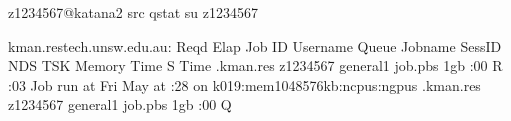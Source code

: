 \documentclass[letterpaper,10pt,english]{sphinxmanual}
\begin{document}
\begin{sphinxVerbatim}[commandchars=\\\{\}]
\PYG{o}{[}z1234567@katana2 src\PYG{o}{]}\PYGZdl{} qstat \PYGZhy{}su z1234567

kman.restech.unsw.edu.au:
                                                            Reqd   Elap
Job ID          Username Queue    Jobname    SessID NDS TSK Memory Time  S Time
\PYGZhy{}\PYGZhy{}\PYGZhy{}\PYGZhy{}\PYGZhy{}\PYGZhy{}\PYGZhy{}\PYGZhy{}\PYGZhy{}\PYGZhy{}\PYGZhy{}\PYGZhy{}\PYGZhy{}\PYGZhy{}\PYGZhy{} \PYGZhy{}\PYGZhy{}\PYGZhy{}\PYGZhy{}\PYGZhy{}\PYGZhy{}\PYGZhy{}\PYGZhy{} \PYGZhy{}\PYGZhy{}\PYGZhy{}\PYGZhy{}\PYGZhy{}\PYGZhy{}\PYGZhy{}\PYGZhy{} \PYGZhy{}\PYGZhy{}\PYGZhy{}\PYGZhy{}\PYGZhy{}\PYGZhy{}\PYGZhy{}\PYGZhy{}\PYGZhy{}\PYGZhy{} \PYGZhy{}\PYGZhy{}\PYGZhy{}\PYGZhy{}\PYGZhy{}\PYGZhy{} \PYGZhy{}\PYGZhy{}\PYGZhy{} \PYGZhy{}\PYGZhy{}\PYGZhy{} \PYGZhy{}\PYGZhy{}\PYGZhy{}\PYGZhy{}\PYGZhy{}\PYGZhy{} \PYGZhy{}\PYGZhy{}\PYGZhy{}\PYGZhy{}\PYGZhy{} \PYGZhy{} \PYGZhy{}\PYGZhy{}\PYGZhy{}\PYGZhy{}\PYGZhy{}
.kman.res z1234567 general1 job.pbs               1gb :00 R :03
   Job run at Fri May  at :28 on k019:mem1048576kb:ncpus:ngpus
.kman.res z1234567 general1 job.pbs       \PYGZhy{}\PYGZhy{}           1gb :00 Q   \PYGZhy{}\PYGZhy{}
    \PYGZhy{}\PYGZhy{}
\end{sphinxVerbatim}
\end{document}
